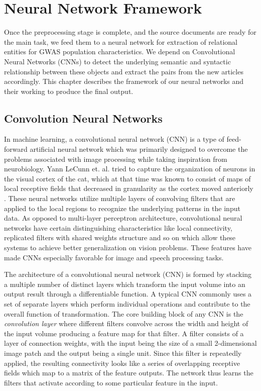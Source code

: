 
\chapter{Neural Network Framework}
\label{chapter:neural-network-learning}
Once the preprocessing stage is complete, and the source documents are ready for the main task, we feed them to a neural network for extraction of relational entities for GWAS population characteristics. We depend on Convolutional Neural Networks (CNNs) to detect the underlying semantic and syntactic relationship between these objects and extract the pairs from the new articles accordingly. This chapter describes the framework of our neural networks and their working to produce the final output. 

\section{Convolution Neural Networks}
\label{section:convolution-neural-networks}
In machine learning, a convolutional neural network (CNN) is a type of feed-forward artificial neural network which was primarily designed to overcome the problems associated with image processing while taking inspiration from neurobiology. Yann LeCunn et. al. tried to capture the organization of neurons in the visual cortex of the cat, which at that time was known to consist of maps of local receptive fields that decreased in granularity as the cortex moved anteriorly \cite{hubel1959receptive}. These neural networks utilize multiple layers of convolving filters that are applied to the local regions to recognize the underlying patterns in the input data. As opposed to multi-layer perceptron architecture, convolutional neural networks have certain distinguishing characteristics like local connectivity, replicated filters with shared weights structure and so on which allow these systems to achieve better generalization on vision problems. These features have made CNNs especially favorable for image and speech processing tasks.

The architecture of a convolutional neural network (CNN) is formed by stacking a multiple number of distinct layers which transform the input volume into an output result through a differentiable function. A typical CNN commonly uses a set of separate layers which perform individual operations and contribute to the overall function of transformation. The core building block of any CNN is the {\it convolution layer} where different filters convolve across the width and height of the input volume producing a feature map for that filter. A filter consists of a layer of connection weights, with the input being the size of a small 2-dimensional image patch and the output being a single unit. Since this filter is repeatedly applied, the resulting connectivity looks like a series of overlapping receptive fields which map to a matrix of the feature outputs. The network thus learns the filters that activate according to some particular feature in the input. 

